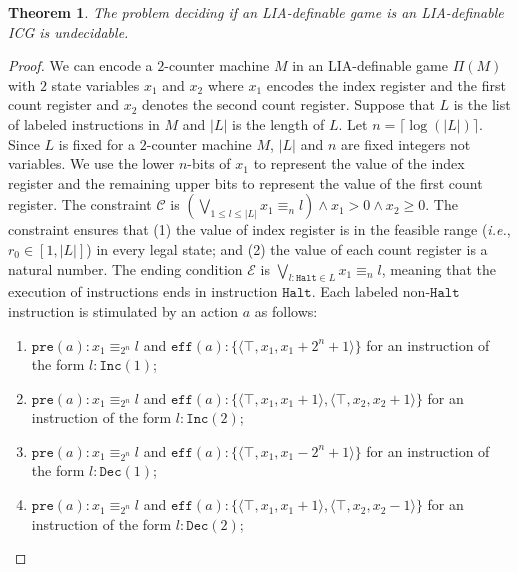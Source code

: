 \documentclass[review]{elsarticle}
\newcommand{\set}[1]{\{ #1 \}}
\newcommand{\tuple}[1]{\langle {#1} \rangle}
\newcommand{\true}{\top}
\newcommand{\constraint}{\mathcal{C}}
\newcommand{\estate}{\mathcal{E}}
\newcommand{\pre}{\mathtt{pre}}
\newcommand{\eff}{\mathtt{eff}}
\newcommand{\len}[1][]{|#1|}
\newcommand{\modulo}{\equiv}
\newcommand\ie{{\it i.e.}}
\newcommand{\ceiling}[1][]{\lceil {#1} \rceil}
\newcommand{\inc}[1][]{\mathtt{Inc}(#1)}
\newcommand{\dec}[1][]{\mathtt{Dec}(#1)}
\newcommand{\halt}{\mathtt{Halt}}
\newtheorem{theorem}{Theorem}
\begin{document}
	\begin{theorem} \label{thm:gameIsICG}
		The problem deciding if an LIA-definable game is an LIA-definable ICG is undecidable.
	\end{theorem}
	\begin{proof}
		We can encode a $2$-counter machine $M$ in an LIA-definable game $\Pi(M)$ with $2$ state variables $x_1$ and $x_2$ where $x_1$ encodes the index register and the first count register and $x_2$ denotes the second count register.
		Suppose that $L$ is the list of labeled instructions in $M$ and $\len[L]$ is the length of $L$.
		Let $n = \ceiling[{\log(\len[L])}]$.
		Since $L$ is fixed for a $2$-counter machine $M$, $\len[L]$ and $n$ are fixed integers not variables.
		We use the lower $n$-bits of $x_1$ to represent the value of the index register and the remaining upper bits to represent the value of the first count register.
		The constraint $\constraint$ is $(\bigvee_{1 \leq l \leq \len[L]} x_1 \modulo_{n} l) \land x_1 > 0 \land x_2 \geq 0$.		
		The constraint ensures that (1) the value of index register is in the feasible range (\ie, $r_0 \in [1, \len[L]]$) in every legal state; and (2) the value of each count register is a natural number.
		The ending condition $\estate$ is $\bigvee_{l: \halt \in L} x_1 \modulo_{n} l$, meaning that the execution of instructions ends in instruction $\halt$.		
		Each labeled non-$\halt$ instruction is stimulated by an action $a$ as follows:
		\begin{enumerate}
			\item $\pre(a): x_1 \modulo_{2^n} l$ and $\eff(a) : \set{\tuple{\true, x_1, x_1 + 2^n + 1}}$ for an instruction of the form $l: \inc[1]$;
			
			\item $\pre(a): x_1 \modulo_{2^n} l$ and $\eff(a) : \set{\tuple{\true, x_1, x_1 + 1}, \tuple{\true, x_2, x_2 + 1}}$ for an instruction of the form $l: \inc[2]$;
			
			\item $\pre(a): x_1 \modulo_{2^n} l$ and $\eff(a) : \set{\tuple{\true, x_1, x_1 - 2^n + 1}}$ for an instruction of the form $l: \dec[1]$;
			
			\item $\pre(a): x_1 \modulo_{2^n} l$ and $\eff(a) : \set{\tuple{\true, x_1, x_1 + 1}, \tuple{\true, x_2, x_2 - 1}}$ for an instruction of the form $l: \dec[2]$;
			

\end{enumerate}
\end{proof}
\end{document}
